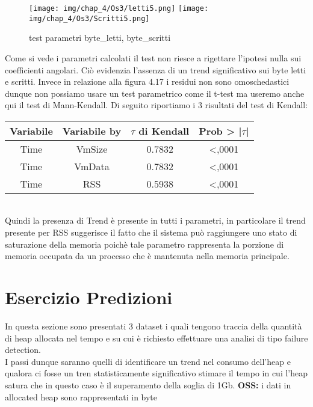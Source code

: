\begin{figure}[H]
    \centering
    \texttt{[image: img/chap\_4/Os3/letti5.png]}
    \texttt{[image: img/chap\_4/Os3/Scritti5.png]}
    \caption{test parametri byte\_letti, byte\_scritti}
    \label{fig:residui_omoschedastici}
\end{figure}
\noindent
Come si vede i parametri calcolati il test
non riesce a rigettare l’ipotesi nulla sui coefficienti angolari. Ciò evidenzia l’assenza di un trend significativo sui byte letti e scritti.
Invece in relazione alla figura 4.17 i residui non sono omoschedastici
dunque non possiamo usare un test parametrico come il t-test ma useremo anche qui il test di Mann-Kendall.
Di seguito riportiamo i 3 risultati del test di Kendall:
\begin{table}[htbp]
    \centering
    \label{tab:esempio}
    \begin{tabular}{|c|c|c|c|} %
        \hline
        Variabile & Variabile by & $\tau$ di Kendall &Prob > |$\tau$| \\ %
        \hline
        Time & VmSize & 0.7832 & <,0001\\
        Time & VmData & 0.7832 & <,0001\\
        Time & RSS & 0.5938 & <,0001\\
        \hline
    \end{tabular}
\end{table}
\\
Quindi la presenza di Trend è presente in tutti i parametri, in particolare il trend presente per RSS suggerisce il fatto che il sistema
può raggiungere uno stato di saturazione della memoria poichè tale parametro rappresenta la porzione di memoria occupata da un processo
che è mantenuta nella memoria principale.
\section{Esercizio Predizioni}
In questa sezione sono presentati 3 dataset i quali tengono traccia della quantità di heap allocata nel tempo e su cui è richiesto effettuare una analisi di tipo failure detection.\\
I passi dunque saranno quelli di identificare un trend nel consumo dell'heap e qualora ci fosse un tren statisticamente significativo stimare il tempo in cui l'heap satura che in questo caso è il superamento della soglia di 1Gb.
\textbf{OSS:} i dati in allocated heap sono rappresentati in byte
